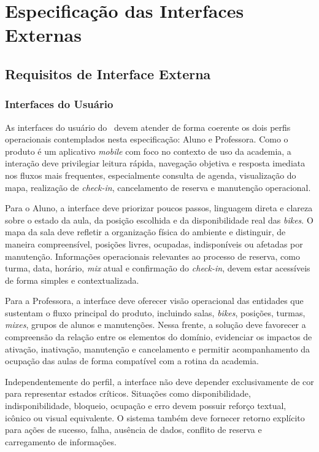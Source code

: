 \section{Especificação das Interfaces Externas}

\subsection{Requisitos de Interface Externa}

\subsubsection{Interfaces do Usuário}
As interfaces do usuário do \ProjetoNome\ devem atender de forma coerente os dois perfis operacionais contemplados nesta especificação: Aluno e Professora. Como o produto é um aplicativo \textit{mobile} com foco no contexto de uso da academia, a interação deve privilegiar leitura rápida, navegação objetiva e resposta imediata nos fluxos mais frequentes, especialmente consulta de agenda, visualização do mapa, realização de \textit{check-in}, cancelamento de reserva e manutenção operacional.

Para o Aluno, a interface deve priorizar poucos passos, linguagem direta e clareza sobre o estado da aula, da posição escolhida e da disponibilidade real das \textit{bikes}. O mapa da sala deve refletir a organização física do ambiente e distinguir, de maneira compreensível, posições livres, ocupadas, indisponíveis ou afetadas por manutenção. Informações operacionais relevantes ao processo de reserva, como turma, data, horário, \textit{mix} atual e confirmação do \textit{check-in}, devem estar acessíveis de forma simples e contextualizada.

Para a Professora, a interface deve oferecer visão operacional das entidades que sustentam o fluxo principal do produto, incluindo salas, \textit{bikes}, posições, turmas, \textit{mixes}, grupos de alunos e manutenções. Nessa frente, a solução deve favorecer a compreensão da relação entre os elementos do domínio, evidenciar os impactos de ativação, inativação, manutenção e cancelamento e permitir acompanhamento da ocupação das aulas de forma compatível com a rotina da academia.

Independentemente do perfil, a interface não deve depender exclusivamente de cor para representar estados críticos. Situações como disponibilidade, indisponibilidade, bloqueio, ocupação e erro devem possuir reforço textual, icônico ou visual equivalente. O sistema também deve fornecer retorno explícito para ações de sucesso, falha, ausência de dados, conflito de reserva e carregamento de informações.

